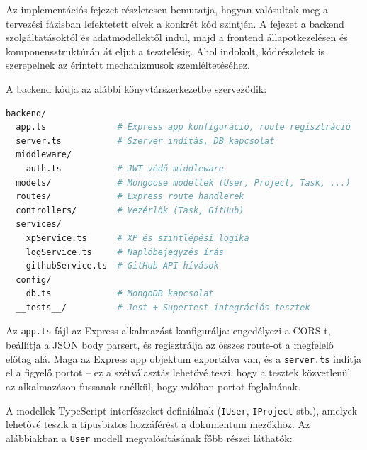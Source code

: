 %

Az implementációs fejezet részletesen bemutatja, hogyan valósultak meg a tervezési fázisban lefektetett elvek a konkrét kód szintjén. A fejezet a backend szolgáltatásoktól és adatmodellektől indul, majd a frontend állapotkezelésen és komponensstruktúrán át eljut a tesztelésig. Ahol indokolt, kódrészletek is szerepelnek az érintett mechanizmusok szemléltetéséhez.




A backend kódja az alábbi könyvtárszerkezetbe szerveződik:

\begin{lstlisting}[language=bash, caption={Backend könyvtárstruktúra}]
backend/
  app.ts              # Express app konfiguráció, route regisztráció
  server.ts           # Szerver indítás, DB kapcsolat
  middleware/
    auth.ts           # JWT védő middleware
  models/             # Mongoose modellek (User, Project, Task, ...)
  routes/             # Express route handlerek
  controllers/        # Vezérlők (Task, GitHub)
  services/
    xpService.ts      # XP és szintlépési logika
    logService.ts     # Naplóbejegyzés írás
    githubService.ts  # GitHub API hívások
  config/
    db.ts             # MongoDB kapcsolat
  __tests__/          # Jest + Supertest integrációs tesztek
\end{lstlisting}

Az \texttt{app.ts} fájl az Express alkalmazást konfigurálja: engedélyezi a CORS-t, beállítja a JSON body parsert, és regisztrálja az összes route-ot a megfelelő előtag alá. Maga az Express app objektum exportálva van, és a \texttt{server.ts} indítja el a figyelő portot – ez a szétválasztás lehetővé teszi, hogy a tesztek közvetlenül az alkalmazáson fussanak anélkül, hogy valóban portot foglalnának.


A modellek TypeScript interfészeket definiálnak \cite{typescript} (\texttt{IUser}, \texttt{IProject} stb.), amelyek lehetővé teszik a típusbiztos hozzáférést a dokumentum mezőkhöz. Az alábbiakban a \texttt{User} modell megvalósításának főbb részei láthatók:

